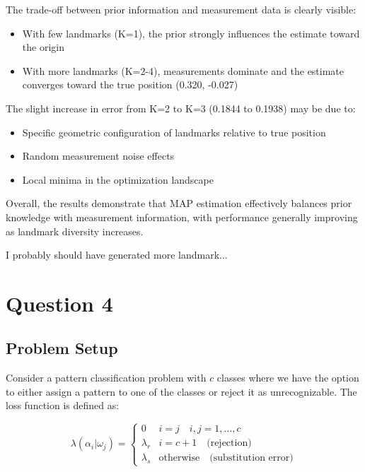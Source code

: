 \documentclass[12pt]{article}
\begin{document}
The trade-off between prior information and measurement data is clearly visible:
\begin{itemize}
    \item With few landmarks (K=1), the prior strongly influences the estimate toward the origin
    \item With more landmarks (K=2-4), measurements dominate and the estimate converges toward the true position (0.320, -0.027)
\end{itemize}

The slight increase in error from K=2 to K=3 (0.1844 to 0.1938) may be due to:
\begin{itemize}
    \item Specific geometric configuration of landmarks relative to true position
    \item Random measurement noise effects
    \item Local minima in the optimization landscape
\end{itemize}

Overall, the results demonstrate that MAP estimation effectively balances prior knowledge with measurement information, with performance generally improving as landmark diversity increases.

I probably should have generated more landmark...
\newpage

\section{Question 4}

\subsection{Problem Setup}
Consider a pattern classification problem with $c$ classes where we have the option to either assign a pattern to one of the classes or reject it as unrecognizable. The loss function is defined as:

\[
\lambda(\alpha_i|\omega_j) = 
\begin{cases}
0 & i = j \quad i,j = 1,\ldots,c \\
\lambda_r & i = c+1 \quad \text{(rejection)} \\
\lambda_s & \text{otherwise} \quad \text{(substitution error)}
\end{cases}
\]
\end{document}

